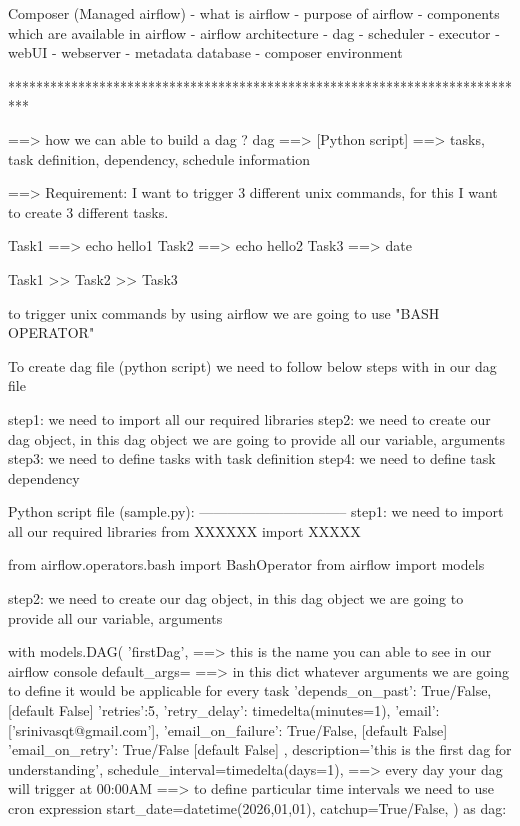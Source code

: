 
Composer (Managed airflow)
	- what is airflow
	- purpose of airflow 
	- components which are available in airflow 
	- airflow architecture 
		- dag
		- scheduler 
		- executor
		- webUI
		- webserver
		- metadata database
	- composer environment
	
***************************************************************************

==> how we can able to build a dag ? 
		dag ==> [Python script] ==> tasks, task definition, dependency, schedule information
		
==> Requirement: I want to trigger 3 different unix commands, for this I want to create 3 different tasks.

	Task1 ==> echo hello1
	Task2 ==> echo hello2
	Task3 ==> date
	
	Task1 >> Task2 >> Task3
	
	to trigger unix commands by using airflow we are going to use "BASH OPERATOR"
	
	To create dag file (python script) we need to follow below steps with in our dag file 
	
	step1: we need to import all our required libraries
	step2: we need to create our dag object, in this dag object we are going to provide all our variable, arguments
	step3: we need to define tasks with task definition
	step4: we need to define task dependency

Python script file (sample.py):
--------------------------------
step1: we need to import all our required libraries
		from XXXXXX import XXXXX
		
		from airflow.operators.bash import BashOperator
		from airflow import models

step2: we need to create our dag object, in this dag object we are going to provide all our variable, arguments

with models.DAG(
'firstDag', ==> this is the name you can able to see in our airflow console
default_args={ ==> in this dict whatever arguments we are going to define it would be applicable for every task
'depends_on_past': True/False, [default False]
'retries':5,
'retry_delay': timedelta(minutes=1),
'email':['srinivasqt@gmail.com'],
'email_on_failure': True/False, [default False]
'email_on_retry': True/False [default False]
},
description='this is the first dag for understanding',
schedule_interval=timedelta(days=1), ==> every day your dag will trigger at 00:00AM
									 ==> to define particular time intervals we need to use cron expression
start_date=datetime(2026,01,01),
catchup=True/False,
) as dag:


